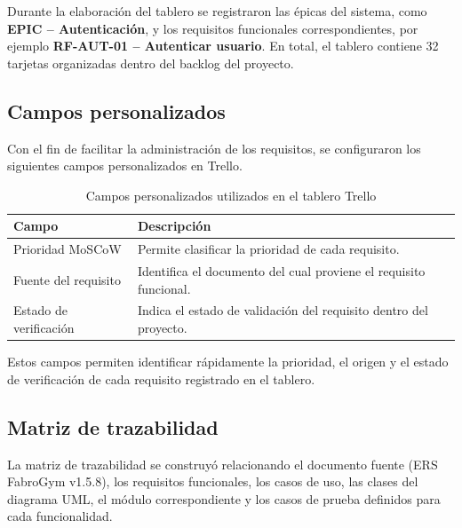 \documentclass[11pt,a4paper]{article}
\begin{document}
Durante la elaboración del tablero se registraron las épicas del sistema, como \textbf{EPIC – Autenticación}, y los requisitos funcionales correspondientes, por ejemplo \textbf{RF-AUT-01 – Autenticar usuario}. En total, el tablero contiene 32 tarjetas organizadas dentro del backlog del proyecto.

\subsection{Campos personalizados}

Con el fin de facilitar la administración de los requisitos, se configuraron los siguientes campos personalizados en Trello.

\begin{table}[H]
\centering
\caption{Campos personalizados utilizados en el tablero Trello}
\label{tab:camposTrello}
\renewcommand{\arraystretch}{1.25}
\begin{tabularx}{0.9\textwidth}{|L{4.5cm}|Y|}
\hline
\textbf{Campo} & \textbf{Descripción} \\ \hline
Prioridad MoSCoW & Permite clasificar la prioridad de cada requisito. \\ \hline
Fuente del requisito & Identifica el documento del cual proviene el requisito funcional. \\ \hline
Estado de verificación & Indica el estado de validación del requisito dentro del proyecto. \\ \hline
\end{tabularx}
\end{table}

Estos campos permiten identificar rápidamente la prioridad, el origen y el estado de verificación de cada requisito registrado en el tablero.

\subsection{Matriz de trazabilidad}

La matriz de trazabilidad se construyó relacionando el documento fuente (ERS FabroGym v1.5.8), los requisitos funcionales, los casos de uso, las clases del diagrama UML, el módulo correspondiente y los casos de prueba definidos para cada funcionalidad.
\end{document}
